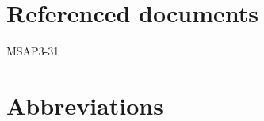\documentclass[a4paper, oneside, 11pt, article, english]{memoir}
\begin{document}
\section{Referenced documents}
\label{sec:docs}

MSAP3-31



\begin{description}
  \firmlist
\end{description}


\section{Abbreviations}
\label{sec:abbrev}

\end{document}
